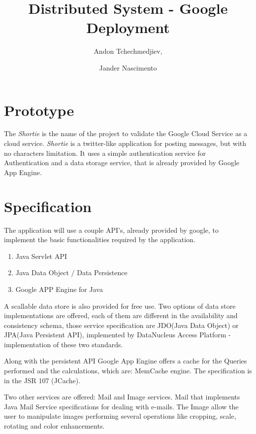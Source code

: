 \documentclass{article}
\begin{document}
\title{Distributed System - Google Deployment}

\author{Andon Tchechmedjiev, 
\and Jander Nascimento}

\maketitle

\section{Prototype}

The \emph{Shortie} is the name of the project to validate the Google Cloud Service as a cloud service.
\emph{Shortie} is a twitter-like application for posting messages, but with no characters limitation. It uses a simple authentication service for Authentication and a data storage service, that is already provided by Google App Engine.

\section{Specification}

The application will use a couple API's, already provided by google, to implement the basic functionalities required by the application. 

\begin{enumerate}
\item Java Servlet API
\item Java Data Object / Data Persistence	
\item Google APP Engine for Java
\end{enumerate}


A scallable data store is also provided for free use. Two options of data store implementations are offered, each of them are different in the availability and consistency schema, those service specification are JDO(Java Data Object) or JPA(Java Persistent API), implemented by DataNucleus Access Platform - implementation of these two standards.

Along with the persistent API Google App Engine offers a cache for the Queries performed and the calculations, which are: MemCache engine. The specification is in the JSR 107 (JCache).

Two other services are offered: Mail and Image services. Mail that implements Java Mail Service specifications for dealing with e-mails. The Image allow the user to manipulate images performing several operations like cropping, scale, rotating and color enhancements.
\end{document}
